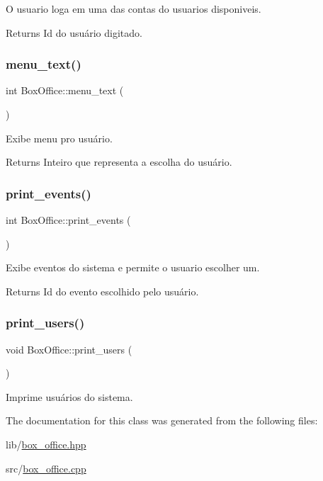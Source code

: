 O usuario loga em uma das contas do usuarios disponiveis. 

\begin{DoxyReturn}{Returns}
Id do usuário digitado. 
\end{DoxyReturn}
\mbox{\label{class_box_office_a1f010f4714351c2f08c7c8940b094914}} 
\subsubsection{\texorpdfstring{menu\+\_\+text()}{menu\_text()}}
{\footnotesize\ttfamily int Box\+Office\+::menu\+\_\+text (\begin{DoxyParamCaption}{ }\end{DoxyParamCaption})}



Exibe menu pro usuário. 

\begin{DoxyReturn}{Returns}
Inteiro que representa a escolha do usuário. 
\end{DoxyReturn}
\mbox{\label{class_box_office_a069cc696cc665eeb00419eed14ef1c45}} 
\subsubsection{\texorpdfstring{print\+\_\+events()}{print\_events()}}
{\footnotesize\ttfamily int Box\+Office\+::print\+\_\+events (\begin{DoxyParamCaption}{ }\end{DoxyParamCaption})}



Exibe eventos do sistema e permite o usuario escolher um. 

\begin{DoxyReturn}{Returns}
Id do evento escolhido pelo usuário. 
\end{DoxyReturn}
\mbox{\label{class_box_office_a24319af273392225975051add861e037}} 
\subsubsection{\texorpdfstring{print\+\_\+users()}{print\_users()}}
{\footnotesize\ttfamily void Box\+Office\+::print\+\_\+users (\begin{DoxyParamCaption}{ }\end{DoxyParamCaption})}



Imprime usuários do sistema. 



The documentation for this class was generated from the following files\+:\begin{DoxyCompactItemize}
\item 
lib/\hyperlink{box__office_8hpp}{box\+\_\+office.\+hpp}\item 
src/\hyperlink{box__office_8cpp}{box\+\_\+office.\+cpp}\end{DoxyCompactItemize}
